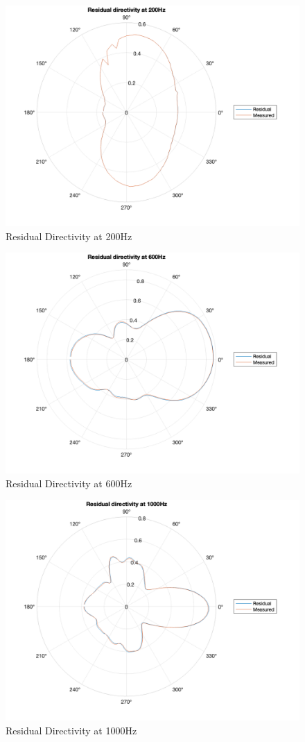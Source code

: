 \documentclass{report}
\begin{document}
            \begin{figure}[H]
                \centering
                \includegraphics[width=0.8\linewidth]{figs/residual200.png}
                \caption{Residual Directivity at 200Hz}
                \label{residual200}
            \end{figure}

            \begin{figure}[H]
                \centering
                \includegraphics[width=0.8\linewidth]{figs/residual600.png}
                \caption{Residual Directivity at 600Hz}
                \label{residual600}
            \end{figure}

            \begin{figure}[H]
                \centering
                \includegraphics[width=0.8\linewidth]{figs/residual1000.png}
                \caption{Residual Directivity at 1000Hz}
                \label{residual1000}
            \end{figure}
\end{document}

